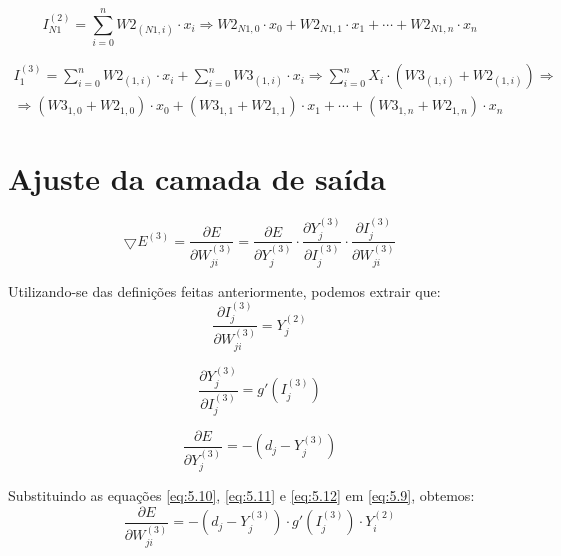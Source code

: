 \documentclass{article}
\begin{document}
\begin{equation}
  I^{(2)}_{N1} = \sum_{i=0}^{n} W2_{(N1,i)} \cdot x_{i} \Longrightarrow
  W2_{N1,0} \cdot x_{0} + W2_{N1,1} \cdot x_{1} + \cdots + W2_{N1,n} \cdot x_{n}
  \label{eq:somatorio_i2n1}
\end{equation}

\begin{align*}
  I^{(3)}_{1} = \sum_{i=0}^{n} W2_{(1,i)} \cdot x_{i} + \sum_{i=0}^{n} W3_{(1,i)} \cdot x_{i}
  \Longrightarrow \sum_{i=0}^{n} X_{i} \cdot (W3_{(1,i)} + W2_{(1,i)}) \Longrightarrow \\
  \Longrightarrow  (W3_{1,0} +  W2_{1,0}) \cdot x_{0} + (W3_{1,1} +  W2_{1,1}) \cdot x_{1} + \cdots +
  (W3_{1,n} +  W2_{1,n})
   \cdot x_{n}
  \label{eq:somatorio_i31}
\end{align*}

\section{Ajuste da camada de saída}

\begin{equation}
  \bigtriangledown E^{(3)} = \frac{\partial E}{\partial W^{(3)}_{ji}} =
  \frac{\partial E}{\partial Y^{(3)}_{j}}
    \cdot
  \frac{\partial Y^{(3)}_{j}}{\partial I^{(3)}_{j}}
    \cdot
  \frac{\partial I^{(3)}_{j}}{\partial W^{(3)}_{ji}}
  \label{eq:5.9}
\end{equation}


\par  Utilizando-se das definições feitas anteriormente, podemos extrair que:
\begin{equation}
  \frac{\partial I^{(3)}_{j}}{\partial W^{(3)}_{ji}} = Y_{j}^{(2)}
  \label{eq:5.10}
\end{equation}


\begin{equation}
  \frac{\partial Y^{(3)}_{j}}{\partial I^{(3)}_{j}} = g'(I_{j}^{(3)})
  \label{eq:5.11}
\end{equation}

\begin{equation}
\frac{\partial E}{\partial Y^{(3)}_{j}} = -(d_{j} - Y_{j}^{(3)})
\label{eq:5.12}
\end{equation}

\par Substituindo as equações \eqref{eq:5.10}, \eqref{eq:5.11} e \eqref{eq:5.12} em \eqref{eq:5.9}, obtemos:
\begin{equation}
  \frac{\partial E}{\partial W_{ji}^{(3)}} = -(d_{j} - Y_{j}^{(3)}) \cdot g'(I_{j}^{(3)}) \cdot Y_{i}^{(2)}
  \label{eq:5.13}
\end{equation}
\end{document}
